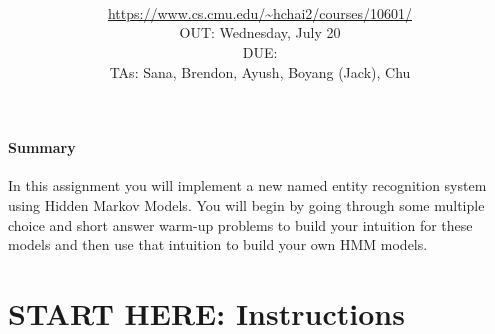 \documentclass[11pt,addpoints,answers]{exam}
\title{\textsc{\hwName}
} %
\author{\courseName\\
\url{https://www.cs.cmu.edu/~hchai2/courses/10601/} \\
OUT: Wednesday, July 20 \\
DUE: \dueDate{} \\ 
TAs: Sana, Brendon, Ayush, Boyang (Jack), Chu
}
\date{}
\date{}
\begin{document}
\maketitle

\begin{notebox}
\paragraph{Summary} In this assignment you will implement a new named entity recognition system using Hidden Markov Models. You will begin by going through some multiple choice and short answer warm-up problems to build your intuition for these models and then use that intuition to build your own HMM models.
\end{notebox}\newcommand \maxsubs {10 }
\section*{START HERE: Instructions}
\end{document}
